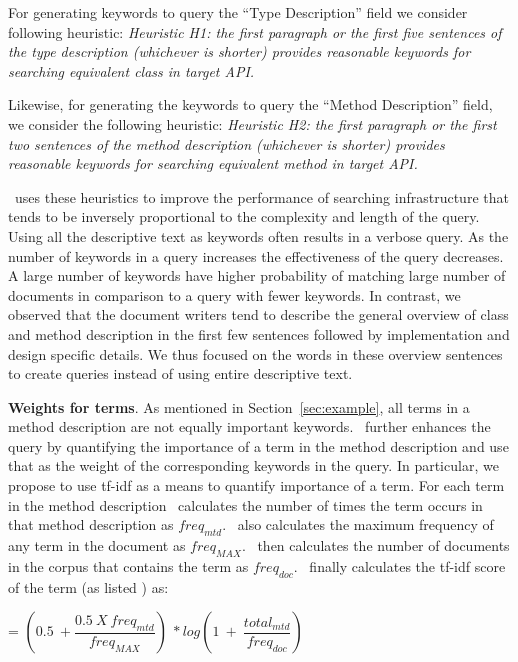 For generating keywords to query the ``Type Description'' field we consider following heuristic:
\textit{Heuristic H1:  the first paragraph or the first five sentences of the type description (whichever is shorter) provides reasonable keywords for searching equivalent class in target API.} 

Likewise, for generating the keywords to query the ``Method Description'' field, we consider the following heuristic: \textit{Heuristic H2: the first paragraph or the first two sentences of the method description (whichever is shorter) provides reasonable keywords for searching equivalent method in target API.}

\tool\ uses these heuristics to improve the performance of searching infrastructure
that tends to be inversely proportional to the complexity and length of the query.
Using all the descriptive text as keywords often results in a verbose query.
As the number of keywords in a query increases the effectiveness of the query decreases.
A large number of keywords have higher probability of matching large number of documents in comparison to a query with fewer keywords.
In contrast, we observed that the document writers tend to describe the general
overview of class and method description in the first few sentences followed by implementation and design specific details.
We thus focused on the words in these overview sentences to create queries instead of using entire descriptive text.


\textbf{Weights for terms}. As mentioned in Section~\ref{sec:example},
all terms in a method description are not equally important keywords. 
\tool\ further enhances the query by quantifying the importance of a term in the method description and use that as the weight of the corresponding keywords in the query.
In particular, we propose to use tf-idf\cite{manning2008introduction} as a means to quantify importance of a term.
For each term in the method description \tool\ calculates the number of times the term occurs in that method description as $freq_{mtd}$.
\tool\ also calculates the maximum frequency of any term in the document as $freq_{MAX}$.
\tool\ then calculates the number of documents in the corpus that contains the term as $freq_{doc}$.
\tool\ finally calculates the tf-idf score of the term (as listed \cite{manning2008introduction}) as:

\begin{center}
	 = $(0.5\ +\dfrac{0.5\ X\ freq_{mtd}}{freq_{MAX}})\ * log(1\ +\ \dfrac{total_{mtd}}{freq_{doc}})$
\end{center}


